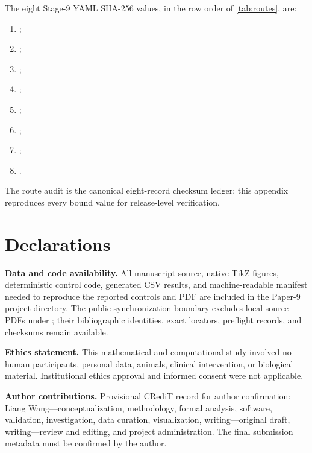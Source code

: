 \documentclass[11pt]{article}
\theoremstyle{definition}
\newcommand{\coord}[1]{\texttt{\detokenize{#1}}}
\begin{document}
The eight Stage-9 YAML SHA-256 values, in the row order of \cref{tab:routes}, are:
\begin{enumerate}
\item {};
\item {};
\item {};
\item {};
\item {};
\item {};
\item {};
\item {}.
\end{enumerate}
The route audit is the canonical eight-record checksum ledger; this appendix reproduces every bound value for release-level verification.

\section*{Declarations}

\noindent\textbf{Data and code availability.}
All manuscript source, native TikZ figures, deterministic control code, generated CSV results, and machine-readable manifest needed to reproduce the reported controls and PDF are included in the Paper-9 project directory.  The public synchronization boundary excludes local source PDFs under \coord{notes/sources/*.pdf}; their bibliographic identities, exact locators, preflight records, and checksums remain available.

\noindent\textbf{Ethics statement.}
This mathematical and computational study involved no human participants, personal data, animals, clinical intervention, or biological material.  Institutional ethics approval and informed consent were not applicable.

\noindent\textbf{Author contributions.}
Provisional CRediT record for author confirmation: Liang Wang---conceptualization, methodology, formal analysis, software, validation, investigation, data curation, visualization, writing---original draft, writing---review and editing, and project administration.  The final submission metadata must be confirmed by the author.
\end{document}
